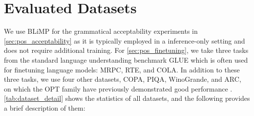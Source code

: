 \documentclass[letterpaper, 12pt]{report}
\begin{document}
% 

\section{Evaluated Datasets}
\label{sec:pos_evaluated_datasets}



We use BLiMP \citep{warstadt-etal-2020-BLiMP-benchmark} for the grammatical acceptability experiments in \autoref{sec:pos_acceptability} as it is typically employed in a inference-only setting and does not require additional training. For \autoref{sec:pos_finetuning}, we take three tasks from the standard language understanding benchmark GLUE \citep{Wang2018:GLUE} which is often used for finetuning language models: MRPC, RTE, and COLA. In addition to these three tasks, we use four other datasets, COPA, PIQA, WinoGrande, and ARC, on which the OPT family have previously demonstrated good performance \cite{Zhang2022:OPT}. \autoref{tab:dataset_detail} shows the statistics of all datasets, and the following provides a brief description of them:
\end{document}
